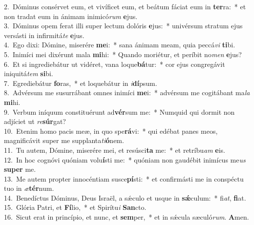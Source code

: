 {2.~}Dóminus consérvet eum, et vivíficet eum, et beátum fáciat eum in \textbf{ter}ra:~* et non tradat eum in ánimam inimicó\textit{rum} \textbf{e}jus.\\
{3.~}Dóminus opem ferat illi super lectum dolóris \textbf{e}jus:~* univérsum stratum ejus versásti in infirmitá\textit{te} \textbf{e}jus.\\
{4.~}Ego dixi: Dómine, miserére \textbf{me}i:~* sana ánimam meam, quia peccá\textit{vi} \textbf{ti}bi.\\
{5.~}Inimíci mei dixérunt mala \textbf{mi}hi:~* Quando moriétur, et períbit no\textit{men} \textbf{e}jus?\\
{6.~}Et si ingrediebátur ut vidéret, vana loque\textbf{bá}tur:~* cor ejus congregávit iniquitá\textit{tem} \textbf{si}bi.\\
{7.~}Egrediebátur \textbf{fo}ras,~* et loquebátur in \textit{i}\textbf{dí}psum.\\
{8.~}Advérsum me susurrábant omnes inimíci \textbf{me}i:~* advérsum me cogitábant ma\textit{la} \textbf{mi}hi.\\
{9.~}Verbum iníquum constituérunt ad\textbf{vér}sum me:~* Numquid qui dormit non adjíciet ut \textit{re}\textbf{súr}gat?\\
{10.~}Etenim homo pacis meæ, in quo spe\textbf{rá}vi:~* qui edébat panes meos, magnificávit super me supplanta\textit{ti}\textbf{ó}nem.\\
{11.~}Tu autem, Dómine, miserére mei, et resúsci\textbf{ta} me:~* et retríbu\textit{am} \textbf{e}is.\\
{12.~}In hoc cognóvi quóniam volu\textbf{í}sti me:~* quóniam non gaudébit inimícus me\textit{us} \textbf{su}\textbf{per} me.\\
{13.~}Me autem propter innocéntiam susce\textbf{pí}sti:~* et confirmásti me in conspéctu tuo in \textit{æ}\textbf{tér}num.\\
{14.~}Benedíctus Dóminus, Deus Israël, a sǽculo et usque in \textbf{sǽ}culum:~* fi\textit{at}, \textbf{fi}at.\\
{15.~}Glória Patri, et \textbf{Fí}lio,~* et Spirítu\textit{i} \textbf{San}cto.\\
{16.~}Sicut erat in princípio, et nunc, et \textbf{sem}per,~* et in sǽcula sæculó\textit{rum}. \textbf{A}men.\\
